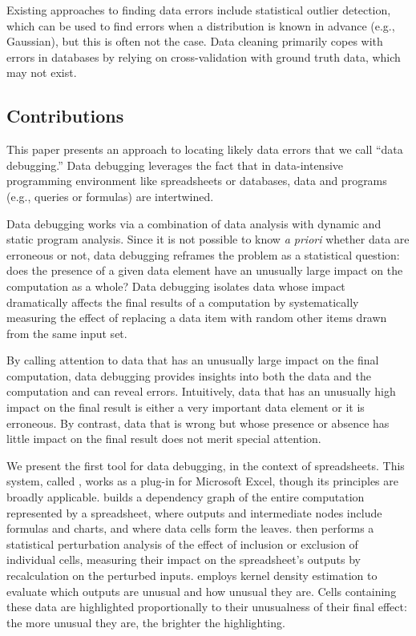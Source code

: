
Existing approaches to finding data errors include statistical outlier
detection, which can be used to find errors when a distribution is
known in advance (e.g., Gaussian), but this is often not the
case. Data cleaning primarily copes with errors in databases by
relying on cross-validation with ground truth data, which may not
exist.

\subsection*{Contributions}

This paper presents an approach to locating likely data errors that we
call ``data debugging.'' Data debugging leverages the fact that in
data-intensive programming environment like spreadsheets or databases,
data and programs (e.g., queries or formulas) are intertwined.

Data debugging works via a combination of data analysis with dynamic
and static program analysis.  Since it is not possible to know \emph{a
priori} whether data are erroneous or not, data debugging reframes the
problem as a statistical question: does the presence of a given data
element have an unusually large impact on the computation as a whole?
Data debugging isolates data whose impact dramatically
affects the final results of a computation by systematically measuring
the effect of replacing a data item with random other items drawn from the
same input set.

By calling attention to data that has an unusually large impact on the
final computation, data debugging provides insights into both the data
and the computation and can reveal errors. Intuitively, data that has
an unusually high impact on the final result is either a very
important data element or it is erroneous. By contrast, data that is
wrong but whose presence or absence has little impact on the final
result does not merit special attention.

We present the first tool for data debugging, in the context
of spreadsheets. This system, called \checkcell{}, works as a plug-in
for Microsoft Excel, though its principles are broadly
applicable. \checkcell{} builds a dependency graph of the entire
computation represented by a spreadsheet, where outputs and
intermediate nodes include formulas and charts, and where data cells
form the leaves. \checkcell{} then performs a statistical perturbation
analysis of the effect of inclusion or exclusion of individual cells,
measuring their impact on the spreadsheet's outputs by recalculation
on the perturbed inputs. \checkcell{} employs kernel density
estimation to evaluate which outputs are unusual and how unusual they
are.  Cells containing these data are highlighted proportionally to
their unusualness of their final effect: the more unusual they are,
the brighter the highlighting.

